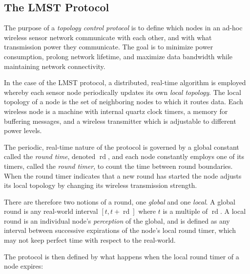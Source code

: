 \documentclass[copyright,creativecommons]{eptcs}
\DeclareMathOperator{\rd}{rd}
\begin{document}
\subsection{The LMST Protocol} 
\label{sub:lmst}

The purpose of a \emph{topology control protocol} is to define which nodes in an
ad-hoc wireless sensor network communicate with each other, and with what
transmission power they communicate. The goal is to minimize power consumption,
prolong network lifetime, and maximize data bandwidth while maintaining network
connectivity. 

In the case of the LMST protocol, a distributed, real-time algorithm is
employed whereby each sensor node periodically updates its own \emph{local
topology}. The local topology of a node is the set of neighboring nodes to
which it routes data. Each wireless node is a machine with internal quartz clock
timers, a memory for buffering messages, and a wireless transmitter which is
adjustable to different power levels. 

The periodic, real-time nature of the protocol is governed by a global constant
called the \emph{round time}, denoted $\rd$, and each node constantly employs
one of its timers, called the \emph{round timer}, to count the time between
round boundaries. When the round timer indicates that a new round has started
the node adjusts its local topology by changing its wireless transmission
strength. 

There are therefore two notions of a round, one \emph{global} and one
\emph{local}. A global round is any real-world interval $[t, t + \rd]$ where
$t$ is a multiple of $\rd$. A local round is an individual node's
\emph{perception} of the global, and is defined as any interval between
successive expirations of the node's local round timer, which may not keep
perfect time with respect to the real-world.

The protocol is then defined by what happens when the local round timer of a
node expires:
\end{document}
